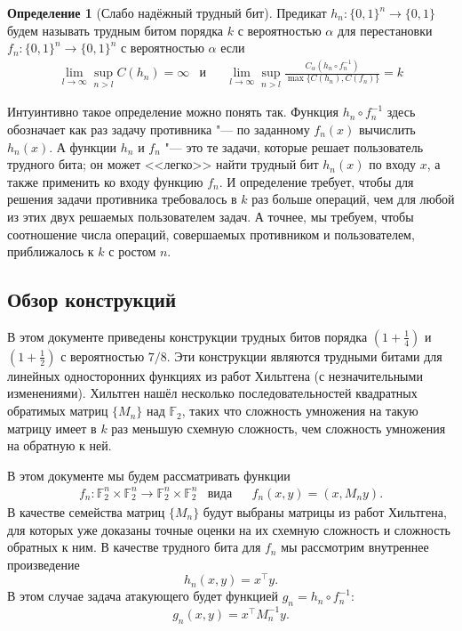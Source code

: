 \documentclass[oneside, a4paper]{article}
\theoremstyle{definition}
\newtheorem{definition}{Определение}
\theoremstyle{remark}
\newcommand\F{\ensuremath{\mathbb F}}
\begin{document}
\begin{definition}[Слабо надёжный трудный бит]
Предикат $h_n : \{0, 1\}^n \to \{0, 1\}$ будем называть трудным битом порядка
$k$ с вероятностью $\alpha$ для перестановки $f_n : \{0, 1\}^n \to \{0, 1\}^n$ с
вероятностью $\alpha$ если
\[
\begin{aligned}
&\lim_{l \to \infty} \sup_{n > l} C(h_n) = \infty
&
\text{и}&
&
\lim_{l \to \infty} \sup_{n > l} \frac {C_\alpha(h_n \circ f_n^{-1})} {\max \{ C(h_n), C(f_n) \}} = k&
\end{aligned}
\]
\end{definition}

Интуинтивно такое определение можно понять так. Функция $h_n \circ f_n^{-1}$
здесь обозначает как раз задачу противника "--- по заданному $f_n(x)$ вычислить
$h_n(x)$. А функции $h_n$ и $f_n$ "--- это те задачи, которые решает
пользователь трудного бита; он может <<легко>> найти трудный бит $h_n(x)$ по
входу $x$, а также применить ко входу функцию $f_n$. И определение требует,
чтобы для решения задачи противника требовалось в $k$ раз больше операций, чем
для любой из этих двух решаемых пользователем задач. А точнее, мы требуем, чтобы
соотношение числа операций, совершаемых противником и пользователем,
приближалось к $k$ с ростом $n$.

\subsection{Обзор конструкций}

В этом документе приведены конструкции трудных битов порядка $(1 + \frac 1 4)$
и $(1 + \frac 1 2)$ с вероятностью $7/8$. Эти конструкции являются трудными
битами для линейных односторонних функциях из работ Хильтгена \cite{hiltgen,
hiltgen} (с незначительными изменениями). Хильтген нашёл несколько
последовательностей квадратных обратимых матриц $\{M_n\}$ над $\F_2$, таких что
сложность умножения на такую матрицу имеет в $k$ раз меньшую схемную сложность,
чем сложность умножения на обратную к ней.

В этом документе мы будем рассматривать функции
\[
\begin{aligned}
&f_n : \F_2^n \times \F_2^n \to \F_2^n \times \F_2^n
&
\text{вида}&
&
f_n(x, y) = (x, M_n y).&
\end{aligned}
\]
В качестве семейства матриц
$\{M_n\}$ будут выбраны матрицы из работ Хильтгена, для которых уже доказаны
точные оценки на их схемную сложность и сложность обратных к ним. В качестве
трудного бита для $f_n$ мы рассмотрим внутреннее произведение \[
h_n(x, y) = x^\top y.
\]
В этом случае задача атакующего будет функцией $g_n = h_n \circ f_n^{-1}$:
\[
g_n(x, y) = x^\top M_n^{-1} y.
\]
\end{document}
